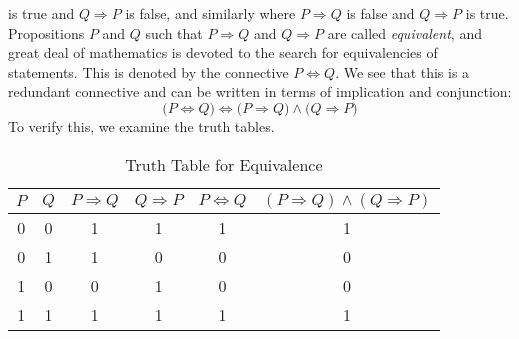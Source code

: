         is true and $Q\Rightarrow{P}$ is false, and similarly where
        $P\Rightarrow{Q}$ is false and $Q\Rightarrow{P}$ is true. Propositions
        $P$ and $Q$ such that $P\Rightarrow{Q}$ and $Q\Rightarrow{P}$ are called
        \textit{equivalent}, and great deal of mathematics is devoted to the
        search for equivalencies of statements. This is denoted by the
        connective $P\Leftrightarrow{Q}$. We see that this is a redundant
        connective and can be written in terms of implication and conjunction:
        \begin{equation}
            \big(P\Leftrightarrow{Q}\big)\Longleftrightarrow
            \big(P\Rightarrow{Q}\big)\land\big(Q\Rightarrow{P}\big)
        \end{equation}
        To verify this, we examine the truth tables.
        \begin{table}[H]
            \centering
            \captionsetup{type=table}
            \begin{tabular}{cccccc}
                $P$&$Q$&$P\Rightarrow{Q}$&$Q\Rightarrow{P}$
                   &$P\Leftrightarrow{Q}$
                   &$(P\Rightarrow{Q})\land(Q\Rightarrow{P})$\\
                \hline
                0&0&1&1&1&1\\
                0&1&1&0&0&0\\
                1&0&0&1&0&0\\
                1&1&1&1&1&1
            \end{tabular}
            \caption{Truth Table for Equivalence}
            \label{tab:Truth_Table_for_Equivalence}
        \end{table}
